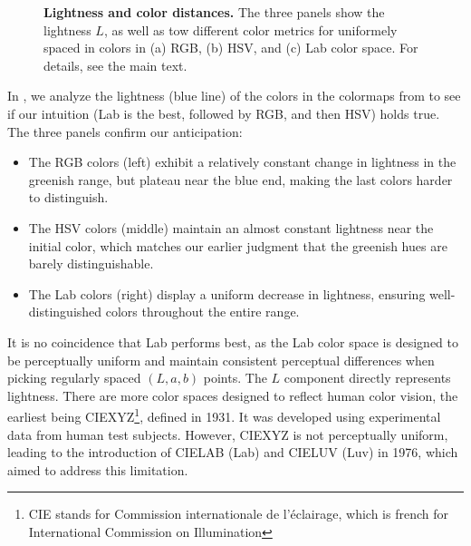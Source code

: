\begin{figure}
	\centering
	
	\caption{\textbf{Lightness and color distances.} The three panels show the lightness $L$, as well as tow different color metrics for uniformely spaced in colors in (a) RGB, (b) HSV, and (c) Lab color space. For details, see the main text.}
	\label{fig:colordiffs}
\end{figure}

In , we analyze the lightness (blue line) of the colors in the colormaps from  to see if our intuition (Lab is the best, followed by RGB, and then HSV) holds true.
The three panels confirm our anticipation:
\begin{itemize}
\item The RGB colors (left) exhibit a relatively constant change in lightness in the greenish range, but plateau near the blue end, making the last colors harder to distinguish.
\item The HSV colors (middle) maintain an almost constant lightness near the initial color, which matches our earlier judgment that the greenish hues are barely distinguishable.
\item The Lab colors (right) display a uniform decrease in lightness, ensuring well-distinguished colors throughout the entire range.
\end{itemize}

It is no coincidence that Lab performs best, as the Lab color space is designed to be perceptually uniform and maintain consistent perceptual differences when picking regularly spaced $(L,a,b)$ points. The $L$ component directly represents lightness. There are more color spaces designed to reflect human color vision, the earliest being CIEXYZ\footnote{CIE stands for Commission internationale de l'éclairage, which is french for International Commission on Illumination}, defined in 1931. It was developed using experimental data from human test subjects. However, CIEXYZ is not perceptually uniform, leading to the introduction of CIELAB (Lab) and CIELUV (Luv) in 1976, which aimed to address this limitation.

